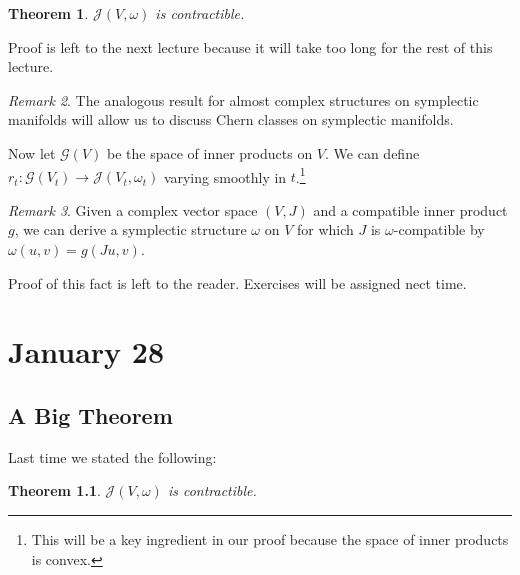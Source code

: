 \documentclass[leqno, openany]{memoir}
\newtheorem{thm}{Theorem}[chapter]
\theoremstyle{definition}
\theoremstyle{remark}
\newtheorem{rmk}[thm]{Remark}
\theoremstyle{plain}
\newtheorem*{thm*}{Theorem}
\theoremstyle{definition}
\theoremstyle{remark}
\newcommand{\mc}[1]{\mathcal{#1}}
\begin{document}
\begin{thm} $\mc{J}(V, \omega)$ is contractible.  \end{thm} Proof is left to
the next lecture because it will take too long for the rest of this lecture.

\begin{rmk} The analogous result for almost complex structures on symplectic
manifolds will allow us to discuss Chern classes on symplectic manifolds.
\end{rmk}

Now let $\mc{G}(V)$ be the space of inner products on $V$. We can define $r_t:
\mc{G}(V_t) \to \mc{J}(V_t, \omega_t)$ varying smoothly in $t$.\footnote{This
will be a key ingredient in our proof because the space of inner products is
convex.}

\begin{rmk} Given a complex vector space $(V, J)$ and a compatible inner
product $g$, we can derive a symplectic structure $\omega$ on $V$ for which $J$
is $\omega$-compatible by $\omega(u,v) = g(Ju, v)$.  \end{rmk} Proof of this
fact is left to the reader. Exercises will be assigned nect time.

\chapter{January 28}%

\section{A Big Theorem}%

Last time we stated the following:

\begin{thm*} $\mc{J}(V, \omega)$ is contractible.  \end{thm*}
\end{document}
